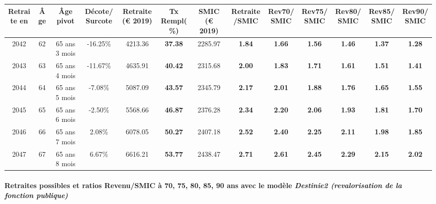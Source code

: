 { \scriptsize \begin{center} 
\begin{tabular}[htb]{|c|c||c|c||c|c||c||c|c|c|c|c|c|} 
\hline 
 Retraite en &  Âge &  Âge pivot &  Décote/Surcote &  Retraite (\euro{} 2019) &  Tx Rempl(\%) &  SMIC (\euro{} 2019) &  Retraite/SMIC &  Rev70/SMIC &  Rev75/SMIC &  Rev80/SMIC &  Rev85/SMIC &  Rev90/SMIC \\ 
\hline \hline 
 2042 &  62 &  65 ans 3 mois &  -16.25\% &  4213.36 &  {\bf 37.38} &  2285.97 &  {\bf 1.84} &  {\bf 1.66} &  {\bf 1.56} &  {\bf 1.46} &  {\bf 1.37} &  {\bf 1.28} \\ 
\hline 
 2043 &  63 &  65 ans 4 mois &  -11.67\% &  4635.91 &  {\bf 40.42} &  2315.68 &  {\bf 2.00} &  {\bf 1.83} &  {\bf 1.71} &  {\bf 1.61} &  {\bf 1.51} &  {\bf 1.41} \\ 
\hline 
 2044 &  64 &  65 ans 5 mois &  -7.08\% &  5087.09 &  {\bf 43.57} &  2345.79 &  {\bf 2.17} &  {\bf 2.01} &  {\bf 1.88} &  {\bf 1.76} &  {\bf 1.65} &  {\bf 1.55} \\ 
\hline 
 2045 &  65 &  65 ans 6 mois &  -2.50\% &  5568.66 &  {\bf 46.87} &  2376.28 &  {\bf 2.34} &  {\bf 2.20} &  {\bf 2.06} &  {\bf 1.93} &  {\bf 1.81} &  {\bf 1.70} \\ 
\hline 
 2046 &  66 &  65 ans 7 mois &  2.08\% &  6078.05 &  {\bf 50.27} &  2407.18 &  {\bf 2.52} &  {\bf 2.40} &  {\bf 2.25} &  {\bf 2.11} &  {\bf 1.98} &  {\bf 1.85} \\ 
\hline 
 2047 &  67 &  65 ans 8 mois &  6.67\% &  6616.21 &  {\bf 53.77} &  2438.47 &  {\bf 2.71} &  {\bf 2.61} &  {\bf 2.45} &  {\bf 2.29} &  {\bf 2.15} &  {\bf 2.02} \\ 
\hline 
\hline 
\end{tabular} 
\end{center} } 
\paragraph{Retraites possibles et ratios Revenu/SMIC à 70, 75, 80, 85, 90 ans avec le modèle \emph{Destinie2 (revalorisation de la fonction publique)}}  
 
